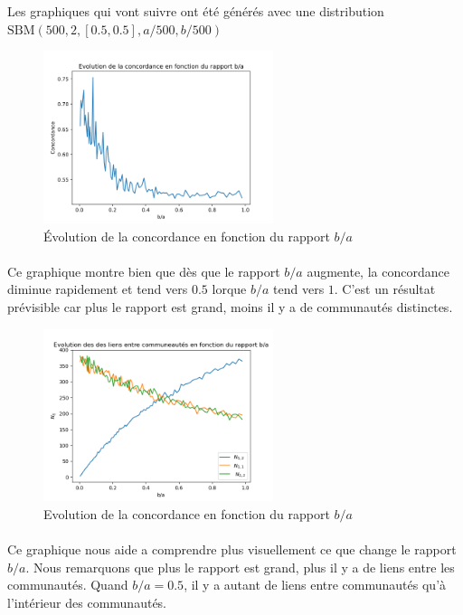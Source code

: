 \subsubsection{}
\paragraph*{}
Les graphiques qui vont suivre ont été générés avec une distribution $\text{SBM}(500,2,[0.5,0.5],a/500,b/500)$
\begin{figure}[H]
    \centering
    \includegraphics[width=0.6\textwidth]{figs/concordance_a_b.png}
    \caption{Évolution de la concordance en fonction du rapport $b/a$}
\end{figure}
\paragraph*{}
Ce graphique montre bien que dès que le rapport $b/a$ augmente, la concordance diminue
rapidement et tend vers $0.5$ lorque $b/a$ tend vers $1$. C'est un résultat prévisible
car plus le rapport est grand, moins il y a de communautés distinctes. 
\begin{figure}[H]
    \centering
    \includegraphics[width=0.6\textwidth]{figs/nij.png}
    \caption{Evolution de la concordance en fonction du rapport $b/a$}
\end{figure}
\paragraph*{}
Ce graphique nous aide a comprendre plus visuellement ce que change le rapport 
$b/a$. Nous remarquons que plus le rapport est grand, plus il y a de liens entre les 
communautés. Quand $b/a = 0.5$, il y a autant de liens entre communautés qu'à
l'intérieur des communautés. 

